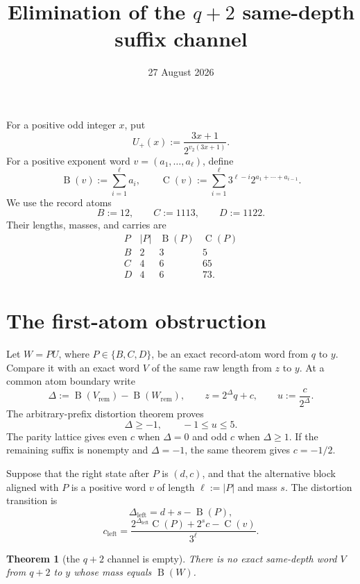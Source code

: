 \documentclass[11pt]{article}
\title{Elimination of the \(q+2\) same-depth suffix channel}
\author{}
\date{27 August 2026}
\newtheorem{theorem}{Theorem}
\newcommand{\Up}{U_+}
\newcommand{\mass}{\operatorname{B}}
\newcommand{\car}{\operatorname{C}}
\begin{document}
\raggedbottom
\maketitle

For a positive odd integer \(x\), put
\[
 \Up(x):=\frac{3x+1}{2^{v_2(3x+1)}}.
 \tag{1}
\]
For a positive exponent word \(v=(a_1,\ldots,a_\ell)\), define
\[
 \mass(v):=\sum_{i=1}^{\ell}a_i,
 \qquad
 \car(v):=\sum_{i=1}^{\ell}
 3^{\ell-i}2^{a_1+\cdots+a_{i-1}}.
 \tag{2}
\]
We use the record atoms
\[
 B:=12,\qquad C:=1113,\qquad D:=1122.
 \tag{3}
\]
Their lengths, masses, and carries are
\[
\begin{array}{c|c|c|c}
 P&|P|&\mass(P)&\car(P)\\ \hline
 B&2&3&5\\
 C&4&6&65\\
 D&4&6&73.
\end{array}
\tag{4}
\]

\section{The first-atom obstruction}

Let \(W=PU\), where \(P\in\{B,C,D\}\), be an exact record-atom word
from \(q\) to \(y\).  Compare it with an exact word \(V\) of the same
raw length from \(z\) to \(y\).  At a common atom boundary write
\[
 \Delta:=\mass(V_{\mathrm{rem}})-\mass(W_{\mathrm{rem}}),
 \qquad
 z=2^\Delta q+c,
 \qquad
 u:=\frac{c}{2^\Delta}.
 \tag{5}
\]
The arbitrary-prefix distortion theorem proves
\[
 \Delta\geq-1,\qquad -1\leq u\leq5.
 \tag{6}
\]
The parity lattice gives even \(c\) when \(\Delta=0\) and odd \(c\)
when \(\Delta\geq1\).  If the remaining suffix is nonempty and
\(\Delta=-1\), the same theorem gives \(c=-1/2\).

Suppose that the right state after \(P\) is \((d,c)\), and that the
alternative block aligned with \(P\) is a positive word \(v\) of length
\(\ell:=|P|\) and mass \(s\).  The distortion transition is
\[
 \Delta_{\mathrm{left}}=d+s-\mass(P),
 \tag{7}
\]
\[
 c_{\mathrm{left}}
 =\frac{2^{\Delta_{\mathrm{left}}}\car(P)
       +2^s c-\car(v)}{3^\ell}.
 \tag{8}
\]

\begin{theorem}[the \(q+2\) channel is empty]
There is no exact same-depth word \(V\) from \(q+2\) to \(y\) whose
mass equals \(\mass(W)\).
\end{theorem}
\end{document}
